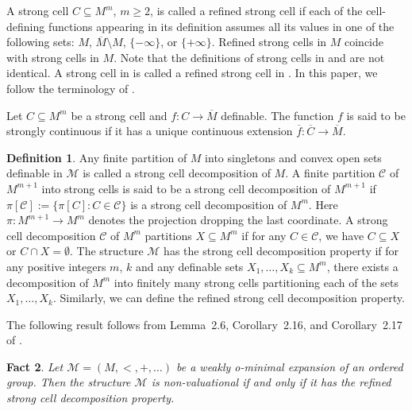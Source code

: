 \documentclass{amsart}
\theoremstyle{definition}
\newtheorem{definition}{Definition}[section]
\theoremstyle{plain}
\newtheorem{fact}[definition]{Fact}
\newcommand{\bN}{\mathbb N}
\newcommand{\cM}{\mathcal M}
\newcommand{\ov}[1]{\overline{#1}}
\begin{document}
A strong cell $C \subseteq M^m$, $m\geq 2$, is called a refined strong cell if 
each of the cell-defining functions appearing in its definition 
assumes all its values in one of the following sets: 
$M$, $\ov{M} \setminus M$,  $\{-\infty \}$, or $\{ +\infty\}$.
Refined strong cells in $M$ coincide with strong cells in $M$.
Note that the definitions of strong cells in \cite{W1} and \cite{W2} are not identical.
A strong cell in \cite{W2} is called a refined strong cell in \cite{W1}.
In this paper, we follow the terminology of \cite{W1}.

Let $C \subseteq M^m$ be a strong cell and $f : C \to \ov{M}$ definable.
The function $f$ is said to be strongly continuous 
if it has a unique continuous extension $\ov{f} : \ov{C} \to \ov{M}$.

\begin{definition}
Any finite partition of $M$ into singletons and convex open sets definable in $\cM$ is called a strong cell decomposition of $M$.
A finite partition $\mathcal C$ of $M^{m+1}$ into strong cells is said to be a strong cell decomposition of $M^{m+1}$
if $\pi[\mathcal C] := \{\pi[C] : C \in \mathcal C \}$ is a strong cell decomposition of $M^m$.
Here $\pi : M^{m+1} \to M^m$ denotes the projection dropping the last coordinate.
A strong cell decomposition $\mathcal C$ of $M^m$ partitions $X \subseteq M^m$
if for any $C \in \mathcal C$, we have $C \subseteq X$ or $C \cap X = \emptyset$.
The structure $\cM$ has the strong cell decomposition property
if for any positive integers $m$, $k$ and any definable sets $X_1, \ldots, X_k \subseteq M^m$,
there exists a decomposition of $M^m$ into finitely many strong cells partitioning each of the sets $X_1, \ldots, X_k$.
Similarly, we can define the refined strong cell decomposition property.
\end{definition}

The following result follows from Lemma~2.6, Corollary~2.16, and Corollary~2.17 of \cite{W1}.

\begin{fact} \label{valuational}
Let $\cM = (M, <, +, \ldots)$ be a weakly o-minimal expansion of an ordered group.
Then the structure $\cM$ is non-valuational if and only if it has the refined strong cell decomposition property.
\end{fact}






%
%
\end{document}
